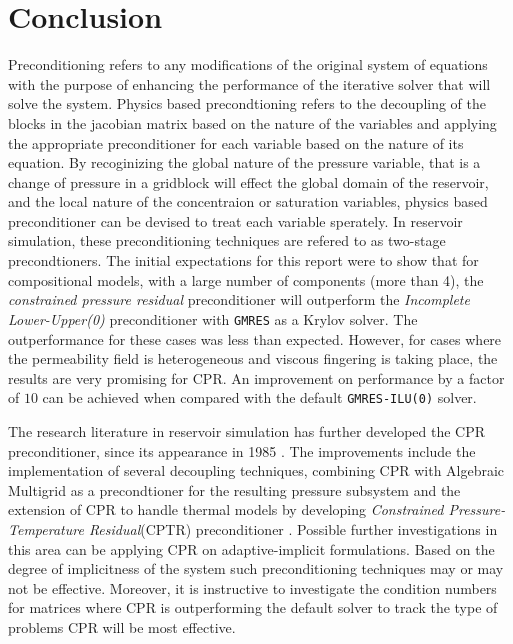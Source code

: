 \chapter{Conclusion}
Preconditioning refers to any modifications of the original system of equations with the purpose of enhancing the performance of
the iterative solver that will solve the system. Physics based precondtioning refers to the decoupling of the blocks in the jacobian
matrix based on the nature of the variables and applying the appropriate preconditioner for each variable based on the nature of its equation.
By recoginizing the global nature of the pressure variable, that is a change of pressure in a gridblock will effect the
global domain of the reservoir, and the local nature of the concentraion or saturation variables, physics based preconditioner can be devised
to treat each variable sperately. In reservoir simulation, these preconditioning techniques are refered to as two-stage precondtioners.
The initial expectations for this report were to show that for compositional models, with a large number of components (more than 4), 
the \textit{constrained pressure residual} preconditioner will outperform the \textit{Incomplete Lower-Upper(0)} preconditioner 
with \texttt{GMRES} as a Krylov solver. The outperformance for these cases was less than expected. However, for cases where 
the permeability field is heterogeneous and viscous fingering is taking place, the results are very promising for CPR. 
An improvement on performance by a factor of $10$ can be achieved when compared with the default \texttt{GMRES-ILU(0)} solver.

The research literature in reservoir simulation has further developed the CPR preconditioner, 
since its appearance in 1985 \cite{Wallis_1985}. The improvements include the implementation of several decoupling techniques, combining
CPR with Algebraic Multigrid as a precondtioner for the resulting pressure subsystem and the extension of CPR to handle thermal models by
developing \textit{Constrained Pressure-Temperature Residual}(CPTR) preconditioner \cite{cptr}.
Possible further investigations in this area can be applying CPR on adaptive-implicit formulations. Based on the degree of implicitness of the
system such preconditioning techniques may or may not be effective. Moreover, it is instructive to investigate the condition numbers for matrices
where CPR is outperforming the default solver to track the type of problems CPR will be most effective.

